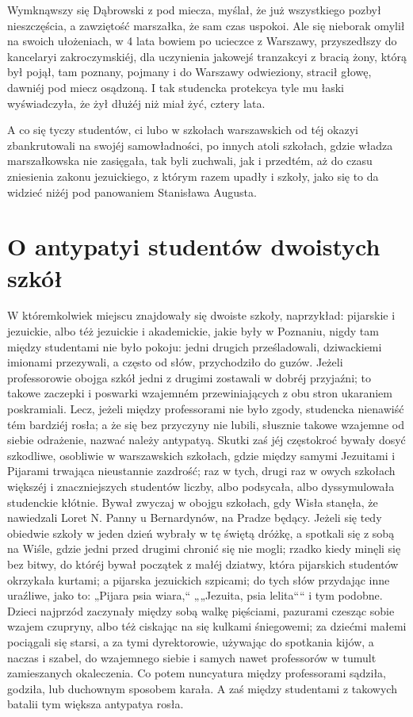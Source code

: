 \documentclass{book}
\begin{document}
Wymknąwszy się Dąbrowski z pod miecza, myślał, że już wszystkiego pozbył nieszczęścia, a zawziętość marszałka, że sam czas uspokoi. Ale się nieborak omylił na swoich ułożeniach, w 4 lata bowiem po ucieczce z Warszawy, przyszedłszy do kancelaryi zakroczymskiéj, dla uczynienia jakowejś tranzakcyi z bracią żony, którą był pojął, tam poznany, pojmany i do Warszawy odwieziony, stracił głowę, dawniéj pod miecz osądzoną. I tak studencka protekcya tyle mu łaski wyświadczyła, że żył dłużéj niż miał żyć, cztery lata.

A co się tyczy studentów, ci lubo w szkołach warszawskich od téj okazyi zbankrutowali na swojéj samowładności, po innych atoli szkołach, gdzie władza marszałkowska nie zasięgała, tak byli zuchwali, jak i przedtém, aż do czasu zniesienia zakonu jezuickiego, z którym razem upadły i szkoły, jako się to da widzieć niżéj pod panowaniem Stanisława Augusta.

\section{O antypatyi studentów dwoistych szkół}

W któremkolwiek miejscu znajdowały się dwoiste szkoły, naprzykład: pijarskie i jezuickie, albo téż jezuickie i akademickie, jakie były w Poznaniu, nigdy tam między studentami nie było pokoju: jedni drugich prześladowali, dziwackiemi imionami przezywali, a często od słów, przychodziło do guzów. Jeżeli professorowie obojga szkół jedni z drugimi zostawali w dobréj przyjaźni; to takowe zaczepki i poswarki wzajemném przewiniających z obu stron ukaraniem poskramiali. Lecz, jeżeli między professorami nie było zgody, studencka nienawiść tém bardziéj rosła; a że się bez przyczyny nie lubili, słusznie takowe wzajemne od siebie odrażenie, nazwać należy antypatyą. Skutki zaś jéj częstokroć bywały dosyć szkodliwe, osobliwie w warszawskich szkołach, gdzie między samymi Jezuitami i Pijarami trwająca nieustannie zazdrość; raz w tych, drugi raz w owych szkołach większéj i znaczniejszych studentów liczby, albo podsycała, albo dyssymulowała studenckie kłótnie. Bywał zwyczaj w obojgu szkołach, gdy Wisła stanęła, że nawiedzali Loret N. Panny u Bernardynów, na Pradze będący. Jeżeli się tedy obiedwie szkoły w jeden dzień wybrały w tę świętą dróżkę, a spotkali się z sobą na Wiśle, gdzie jedni przed drugimi chronić się nie mogli; rzadko kiedy minęli się bez bitwy, do któréj bywał początek z małéj dziatwy, która pijarskich studentów okrzykała kurtami; a pijarska jezuickich szpicami; do tych słów przydając inne uraźliwe, jako to: „Pijara psia wiara,“ „„Jezuita, psia lelita““ i tym podobne. Dzieci najprzód zaczynały między sobą walkę pięściami, pazurami czesząc sobie wzajem czupryny, albo téż ciskając na się kulkami śniegowemi; za dziećmi małemi pociągali się starsi, a za tymi dyrektorowie, używając do spotkania kijów, a naczas i szabel, do wzajemnego siebie i samych nawet professorów w tumult zamieszanych okaleczenia. Co potem nuncyatura między professorami sądziła, godziła, lub duchownym sposobem karała. A zaś między studentami z takowych batalii tym większa antypatya rosła.
\end{document}
